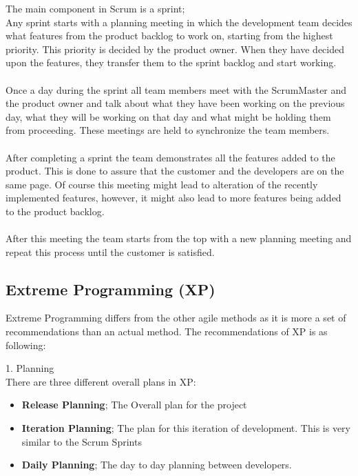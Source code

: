 The main component in Scrum is a sprint; \\
Any sprint starts with a planning meeting in which the development team decides what features from the product backlog to work on, starting from the highest priority. This priority is decided by the product owner. When they have decided upon the features, they transfer them to the sprint backlog and start working. \\
 \\
Once a day during the sprint all team members meet with the ScrumMaster and the product owner and talk about what they have been working on the previous day, what they will be working on that day and what might be holding them from proceeding. These meetings are held to synchronize the team members.\\
 \\
After completing a sprint the team demonstrates all the features added to the product. This is done to assure that the customer and the developers are on the same page. Of course this meeting might lead to alteration of the recently implemented features, however, it might also lead to more features being added to the product backlog.\\
 \\
After this meeting the team starts from the top with a new planning meeting and repeat this process until the customer is satisfied.

\subsection{Extreme Programming (XP)}
Extreme Programming differs from the other agile methods as it is more a set of recommendations than an actual method. The recommendations of XP is as following:

1. Planning\\
There are three different overall plans in XP:
\begin{itemize}
	\item \textbf{Release Planning}; The Overall plan for the project
	\item \textbf{Iteration Planning}; The plan for this iteration of development. This is very similar to the Scrum Sprints
	\item \textbf{Daily Planning}; The day to day planning between developers.
\end{itemize}

